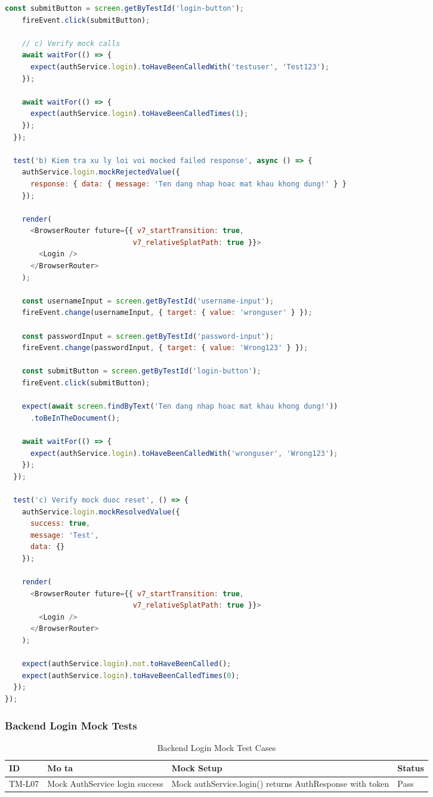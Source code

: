 \begin{lstlisting}[language=JavaScript, caption=Login Component Mock Test]
    const submitButton = screen.getByTestId('login-button');
    fireEvent.click(submitButton);

    // c) Verify mock calls
    await waitFor(() => {
      expect(authService.login).toHaveBeenCalledWith('testuser', 'Test123');
    });

    await waitFor(() => {
      expect(authService.login).toHaveBeenCalledTimes(1);
    });
  });

  test('b) Kiem tra xu ly loi voi mocked failed response', async () => {
    authService.login.mockRejectedValue({
      response: { data: { message: 'Ten dang nhap hoac mat khau khong dung!' } }
    });

    render(
      <BrowserRouter future={{ v7_startTransition: true, 
                              v7_relativeSplatPath: true }}>
        <Login />
      </BrowserRouter>
    );

    const usernameInput = screen.getByTestId('username-input');
    fireEvent.change(usernameInput, { target: { value: 'wronguser' } });

    const passwordInput = screen.getByTestId('password-input');
    fireEvent.change(passwordInput, { target: { value: 'Wrong123' } });

    const submitButton = screen.getByTestId('login-button');
    fireEvent.click(submitButton);

    expect(await screen.findByText('Ten dang nhap hoac mat khau khong dung!'))
      .toBeInTheDocument();

    await waitFor(() => {
      expect(authService.login).toHaveBeenCalledWith('wronguser', 'Wrong123');
    });
  });

  test('c) Verify mock duoc reset', () => {
    authService.login.mockResolvedValue({
      success: true,
      message: 'Test',
      data: {}
    });

    render(
      <BrowserRouter future={{ v7_startTransition: true, 
                              v7_relativeSplatPath: true }}>
        <Login />
      </BrowserRouter>
    );

    expect(authService.login).not.toHaveBeenCalled();
    expect(authService.login).toHaveBeenCalledTimes(0);
  });
});
\end{lstlisting}

\subsubsection{Backend Login Mock Tests}
\begin{table}[H]
\centering
\small
\begin{tabular}{|p{1cm}|p{4cm}|p{5cm}|p{2cm}|}
\hline
\textbf{ID} & \textbf{Mo ta} & \textbf{Mock Setup} & \textbf{Status} \\
\hline
TM-L07 & Mock AuthService login success & Mock authService.login() returns AuthResponse with token & Pass \\
\hline
\end{tabular}
\caption{Backend Login Mock Test Cases}
\end{table}

